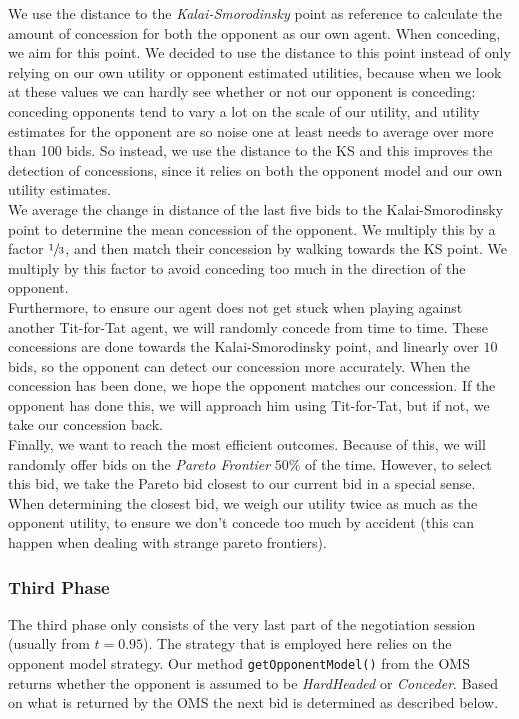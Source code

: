 We use the distance to the \emph{Kalai-Smorodinsky} point as reference to calculate
the amount of concession for both the opponent as our own agent. When conceding, we aim for this point.
We decided to use the distance to this point instead of only relying on our own utility 
or opponent estimated utilities, because when we look at these values we can hardly see whether or not our opponent is conceding: conceding opponents tend to vary a lot on the scale of our utility,
and utility estimates for the opponent are so noise one at least needs to average over more than 100 bids. So instead, we use the distance to the KS and this improves the detection of concessions,
since it relies on both the opponent model and our own utility estimates. \\

We average the change in distance of the last five bids to the Kalai-Smorodinsky point to determine the mean concession of the opponent. We
multiply this by a factor $\sfrac{1}{3}$, and then match their concession by walking towards the KS point. We multiply by this factor to avoid conceding too much in the direction of the opponent. \\

Furthermore, to ensure our agent does not get stuck when playing against 
another Tit-for-Tat agent, we will randomly concede from time to time. 
These concessions are done towards the Kalai-Smorodinsky point, and linearly over 
$10$ bids, so the opponent can detect our concession more accurately. When the concession has been done, we hope the opponent matches  our concession. If the opponent has done this, we will approach him using Tit-for-Tat, but if not, we take our concession back. \\

Finally, we want to reach the most efficient outcomes. Because of this,
we will randomly offer bids on the \emph{Pareto Frontier} $50\%$ of the time.
However, to select this bid, we take the Pareto bid closest to our current bid in a special sense.
When determining the closest bid, we weigh our utility twice as much
as the opponent utility, to ensure we don't concede too much by accident 
(this can happen when dealing with strange pareto frontiers).

\subsubsection{Third Phase}

The third phase only consists of the very last part of the negotiation session (usually from $t=0.95$). The strategy that is employed here relies on the opponent model strategy. Our method \texttt{getOpponentModel()} from the OMS returns whether the opponent is assumed to be \emph{HardHeaded} or \emph{Conceder}. Based on what is returned by the OMS the next bid is determined as described below.

